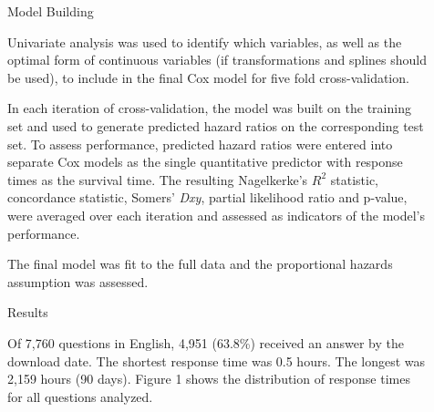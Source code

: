 \documentclass[final]{beamer}
\newlength{\sepwid}
\newlength{\onecolwid}
\newlength{\twocolwid}
\begin{document}
\begin{frame}[t]
\begin{columns}[t]
\begin{column}{\onecolwid}

\end{column} %

\begin{column}{\sepwid}\end{column} %

\begin{column}{\twocolwid} %

\begin{columns}[t,totalwidth=\twocolwid] %

\begin{column}{\onecolwid}\vspace{-.6in} %

\begin{block}{Model Building}

\textcolor{dblue!70}{} Univariate analysis was used to identify which variables, as well as the optimal form of continuous variables (if transformations and splines should be used), to include in the final Cox model for five fold cross-validation. 

\textcolor{dblue!70}{} In each iteration of cross-validation, the model was built on the training set and used to generate predicted hazard ratios on the corresponding test set. To assess performance, predicted hazard ratios were entered into separate Cox models as the single quantitative predictor with response times as the survival time. The resulting Nagelkerke's $R^2$ statistic, concordance statistic, Somers' \textit{Dxy}, partial likelihood ratio and p-value, were averaged over each iteration and assessed as indicators of the model's performance.  

\textcolor{dblue!70}{} The final model was fit to the full data and the proportional hazards assumption was assessed. 
\end{block}


\begin{block}{Results}

Of 7,760 questions in English, 4,951 (63.8\%) received an answer by the download date. The shortest response time was 0.5 hours. The longest was 2,159 hours (90 days). Figure 1 shows the distribution of response times for all questions analyzed. 


\end{block}
\end{column}
\end{columns}
\end{column}
\end{columns}
\end{frame}
\end{document}
